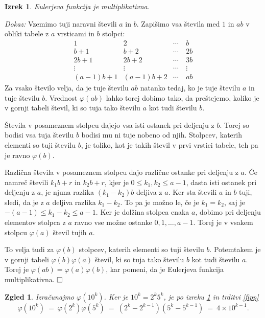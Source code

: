 \documentclass[a4paper,12pt]{article}
\def\qed{$\hfill\Box$}   %
\newtheorem{izrek}{Izrek}
\newtheorem{zgled}{Zgled}
\begin{document}
\begin{izrek}
\label{fimult}
Eulerjeva funkcija je multiplikativna.
\end{izrek}

\noindent
{\em Dokaz:\/} Vzemimo tuji naravni števili $a$ in $b$. Zapišimo vsa števila med $1$ in $ab$
v obliki tabele z $a$ vrsticami in $b$ stolpci:
\[
\begin{array}{cccc}
1 & 2 & \cdots & \ b \\
b+1 & b+2 & \cdots & \ 2b \\
2b+1 & 2b+2 & \cdots & \ 3b \\
\vdots & \vdots & \cdots & \ \vdots \\
(a-1)b+1 & (a-1)b+2 & \cdots & \ ab 
\end{array}
\]
Za vsako število velja, da je tuje številu $ab$ natanko tedaj, ko je tuje številu $a$ in tuje številu $b$.
Vrednost $\varphi(ab)$ lahko torej dobimo tako, da preštejemo, koliko je v gornji tabeli števil, ki so tuja
tako številu $a$ kot tudi številu $b$. 

Števila v posameznem stolpcu dajejo vsa isti ostanek pri deljenju z $b$. Torej so bodisi vsa tuja številu
$b$ bodisi mu ni tuje nobeno od njih. Stolpcev, katerih elementi so tuji številu $b$, je toliko, kot je
takih števil v prvi vrstici tabele, teh pa je ravno $\varphi(b)$.

Različna števila v posameznem stolpcu dajo različne ostanke pri deljenju z $a$. Če namreč števili
$k_1 b + r$ in $k_2 b + r$, kjer je $0 \le k_1, k_2 \le a-1$, dasta isti ostanek pri deljenju z $a$, je njuna razlika $(k_1 - k_2) b$
deljiva z $a$. Ker sta števili $a$ in $b$ tuji, sledi, da je z $a$ deljiva razlika $k_1 - k_2$.
To pa je možno le, če je $k_1 = k_2$, saj je $-(a-1) \le k_1 - k_2 \le a-1$. Ker je dolžina stolpca
enaka $a$, dobimo pri deljenju elementov stolpca z $a$ ravno vse možne ostanke $0, 1,\ldots, a-1$.
Torej je v vsakem stolpcu $\varphi(a)$ števil tujih $a$. 

To velja tudi za $\varphi(b)$ stolpcev, katerih elementi so tuji številu $b$. Potemtakem je v gornji tabeli
$\varphi(b)\varphi(a)$ števil, ki so tuja tako številu $b$ kot tudi številu $a$. 
Torej je $\varphi(ab) = \varphi(a)\varphi(b)$, kar pomeni, da je Eulerjeva funkcija multiplikativna. \qed


\begin{zgled}
Izračunajmo $\varphi(10^k)$. Ker je $10^k = 2^k 5^k$, je po izreku \ref{fimult} in trditvi \ref{fipp}
\[
\varphi(10^k)\ =\ \varphi(2^k)\varphi(5^k)\ =\ (2^k - 2^{k-1})(5^k - 5^{k-1})\ =\ 4\times 10^{k-1}.
\]
\end{zgled}
\end{document}
